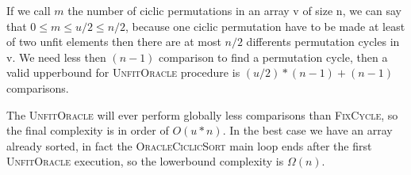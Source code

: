 If we call $m$ the number of ciclic permutations in an array v of size n, we can say that $0 \le m \le u/2 \le n/2$, because one ciclic permutation have to be made at least of two unfit elements then there are at most $n/2$ differents permutation cycles in v.
We need less then $(n-1)$ comparison to find a permutation cycle, then a valid upperbound for \textsc{UnfitOracle} procedure is $(u/2)*(n-1) + (n-1)$ comparisons.

The \textsc{UnfitOracle} will ever perform globally less comparisons than \textsc{FixCycle}, so the final complexity is in order of $O(u*n)$.
In the best case we have an array already sorted, in fact the \textsc{OracleCiclicSort} main loop ends after the first \textsc{UnfitOracle} execution, so the lowerbound complexity is $\Omega(n)$.
